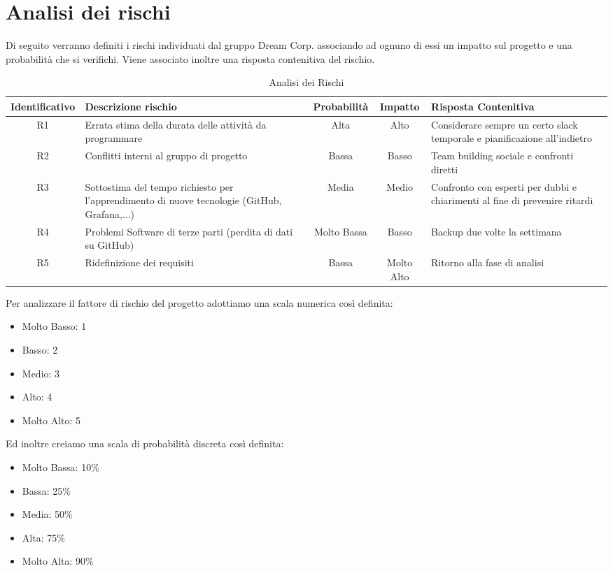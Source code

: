 \section{Analisi dei rischi}

	Di seguito verranno definiti i rischi individuati dal gruppo Dream Corp. associando ad ognuno di essi un impatto sul progetto e una probabilità che si verifichi. Viene associato inoltre una risposta contenitiva del rischio. 
	\begin{table}[!htpb]
		\centering
		\renewcommand{\arraystretch}{2} 
		\begin{tabular}{|c|p{3.6cm}|c|c|p{3.6cm}|}
			\rowcolor{orange!50}
			\hline
			\textbf{Identificativo} & \textbf{Descrizione rischio} & \textbf{Probabilità} & \textbf{Impatto} & \textbf{Risposta Contenitiva}\\
			\hline
			R1 & Errata stima della durata delle attività da programmare & Alta & Alto & Considerare sempre un certo slack temporale e pianificazione all’indietro\\
			\hline
			R2 & Conflitti interni al gruppo di progetto & Bassa & Basso & Team building sociale e confronti diretti\\
			\hline
			R3 & Sottostima del tempo richiesto per l’apprendimento di nuove tecnologie (GitHub, Grafana,...) & Media & Medio & Confronto con esperti per dubbi e chiarimenti al fine di prevenire ritardi\\
			\hline
			R4 & Problemi Software di terze parti (perdita di dati su GitHub) & Molto  Bassa & Basso &  Backup due volte la settimana\\
			\hline
			R5 & Ridefinizione dei requisiti & Bassa & Molto Alto & Ritorno alla fase di analisi\\
			\hline
		\end{tabular}
		\caption{Analisi dei Rischi}
	\end{table}
	\clearpage
	Per analizzare il fattore di rischio del progetto adottiamo una scala numerica così definita:
	\begin{itemize}
		\item Molto Basso: 1
		\item Basso: 2
		\item Medio: 3
		\item Alto: 4
		\item Molto Alto: 5
	\end{itemize}
	Ed inoltre creiamo una scala di probabilità discreta così definita:
	\begin{itemize}
		\item Molto Bassa: 10\%
		\item Bassa: 25\%
		\item Media: 50\%
		\item Alta: 75\%
		\item Molto Alta: 90\%
	\end{itemize}
